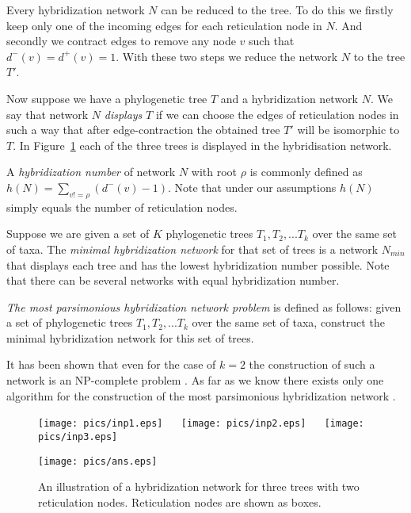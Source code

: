 \documentclass[runningheads, envcountsame, a4paper]{llncs}
\begin{document}
Every hybridization network $N$ can be reduced to the tree. To do this we firstly keep only one of the incoming edges for each reticulation node in $N$. 
And secondly we contract edges to remove any node $v$ such that $d^-(v) = d^+(v) = 1$. With these two steps we reduce the network $N$ 
to the tree $T'$.

Now suppose we have a phylogenetic tree $T$ and a hybridization network $N$. We say that network $N$ \emph{displays} $T$ 
if we can choose the edges of reticulation nodes in such a way that after edge-contraction the obtained tree $T'$ will be 
isomorphic to $T$. In Figure~\ref{network-example} each of the three trees is displayed in the hybridisation network.

A \emph{hybridization number} of network $N$ with root $\rho$ is commonly defined as $h(N) = \sum\limits_{v != \rho} (d^-(v) - 1)$.
Note that under our assumptions $h(N)$ simply equals the number of reticulation nodes.

Suppose we are given a set of $K$ phylogenetic trees $T_1, T_2, ... T_k$ over the same set of taxa. The \emph{minimal 
hybridization network} for that set of trees is a network $N_{min}$ that displays each tree and has the lowest 
hybridization number possible. Note that there can be several networks with equal hybridization number.

\emph{The most parsimonious hybridization network problem} is defined as follows:
given a set of phylogenetic trees $T_1, T_2, ... T_k$ over the same set of taxa, construct the minimal hybridization 
network for this set of trees.

It has been shown that even for the case of $k=2$ the construction of such a network is an NP-complete problem 
\cite {bordewich2007computing}. As far as we know there exists only one algorithm for the construction of the most 
parsimonious hybridization network \cite {wu2013algorithm}.

\begin{figure}[t]
  \centering
  \begin{minipage}[b]{0.59\linewidth}
    \texttt{[image: pics/inp1.eps]}
    ~~
    \texttt{[image: pics/inp2.eps]}
    ~~
    \texttt{[image: pics/inp3.eps]}
  \end{minipage}
  \hfill
  \begin{minipage}[b]{0.40\linewidth}
    \texttt{[image: pics/ans.eps]}
  \end{minipage}
  \caption{An illustration of a hybridization network for three trees with two reticulation nodes. Reticulation nodes are shown as boxes.}
  \label{network-example}
\end{figure}
\end{document}
